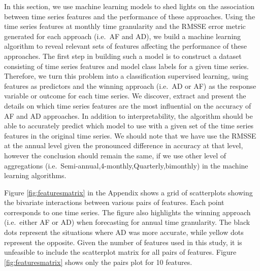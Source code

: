 \documentclass[]{elsarticle} %
\begin{document}
In this section, we use machine learning models to shed lights on the
association between time series features and the performance of these
approaches. Using the time series features at monthly time granularity
and the RMSSE error metric generated for each approach (i.e.~AF and AD),
we build a machine learning algorithm to reveal relevant sets of
features affecting the performance of these approaches. The first step
in building such a model is to construct a dataset consisting of time
series features and model class labels for a given time series.
Therefore, we turn this problem into a classification supervised
learning, using features as predictors and the winning approach (i.e.~AD
or AF) as the response variable or outcome for each time series. We
discover, extract and present the details on which time series features
are the most influential on the accuracy of AF and AD approaches. In
addition to interpretability, the algorithm should be able to accurately
predict which model to use with a given set of the time series features
in the original time series. We should note that we have use the RMSSE
at the annual level given the pronounced difference in accuracy at that
level, however the conclusion should remain the same, if we use other
level of aggregations (i.e.~Semi-annual,4-monthly,Quarterly,bimonthly)
in the machine learning algorithms.

Figure \ref{fig:featuresmatrix} in the Appendix shows a grid of
scatterplots showing the bivariate interactions between various pairs of
features. Each point corresponds to one time series. The figure also
highlights the winning approach (i.e.~either AF or AD) when forecasting
for annual time granularity. The black dots represent the situations
where AD was more accurate, while yellow dots represent the opposite.
Given the number of features used in this study, it is unfeasible to
include the scatterplot matrix for all pairs of features. Figure
\ref{fig:featuresmatrix} shows only the pairs plot for 10 features.
\end{document}
